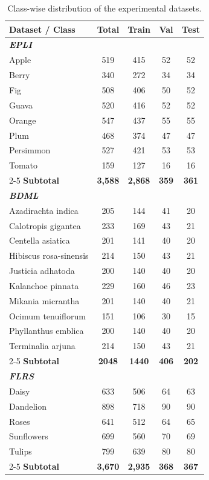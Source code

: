 \begin{table}[t]
	\centering
	\caption{Class-wise distribution of the experimental datasets.}
	\label{tab:classwise_dataset_distribution}
	\small
	\begin{tabular}{l cccc}
		\toprule
		\textbf{Dataset / Class} & \textbf{Total} & \textbf{Train} & \textbf{Val} & \textbf{Test} \\
		\midrule
		\multicolumn{5}{l}{\textit{\textbf{EPLI}}} \\
		Apple      & 519  & 415  & 52  & 52  \\
		Berry      & 340  & 272  & 34  & 34  \\
		Fig        & 508  & 406  & 50  & 52  \\
		Guava      & 520  & 416  & 52  & 52  \\
		Orange     & 547  & 437  & 55  & 55  \\
		Plum       & 468  & 374  & 47  & 47  \\
		Persimmon  & 527  & 421  & 53  & 53  \\
		Tomato     & 159  & 127  & 16  & 16  \\
		\cmidrule(lr){2-5}
		\textbf{Subtotal} & \textbf{3,588} & \textbf{2,868} & \textbf{359} & \textbf{361} \\
		
		\midrule
		\multicolumn{5}{l}{\textit{\textbf{BDML}}} \\
		Azadirachta indica   & 205 & 144 & 41 & 20 \\
		Calotropis gigantea   & 233 & 169 & 43 & 21 \\
		Centella asiatica   & 201 & 141 & 40 & 20 \\
		Hibiscus rosa-sinensis   & 214 & 150 & 43 & 21 \\
		Justicia adhatoda   & 200 & 140 & 40 & 20 \\
		Kalanchoe pinnata   & 229 & 160 & 46 & 23 \\
		Mikania micrantha   & 201 & 140 & 40 & 21 \\
		Ocimum tenuiflorum   & 151 & 106 & 30 & 15 \\
        Phyllanthus emblica   & 200 & 140 & 40 & 20 \\
        Terminalia arjuna   & 214 & 150 & 43 & 21 \\
		\cmidrule(lr){2-5}
		\textbf{Subtotal} & \textbf{2048} & \textbf{1440} & \textbf{406} & \textbf{202} \\
		
		\midrule
		\multicolumn{5}{l}{\textit{\textbf{FLRS}}} \\
		Daisy      & 633  & 506  & 64  & 63  \\
		Dandelion  & 898  & 718  & 90  & 90  \\
		Roses      & 641  & 512  & 64  & 65  \\
		Sunflowers & 699  & 560  & 70  & 69  \\
		Tulips     & 799  & 639  & 80  & 80  \\
		\cmidrule(lr){2-5}
		\textbf{Subtotal} & \textbf{3,670} & \textbf{2,935} & \textbf{368} & \textbf{367} \\
		

\end{tabular}
\end{table}
